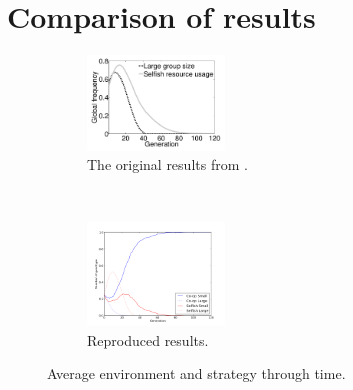 \documentclass[11pt]{ecsarticle}
\begin{document}
\section{Comparison of results}\label{sc:reimp:results}
\begin{figure}
        \centering
        \begin{subfigure}[b]{0.4\textwidth}
                \includegraphics[width=0.4\textwidth]{orig_a.png}
                \caption{The original results from \cite{powers2007individual}.}
                \label{fig:orig:A}
        \end{subfigure}%
        ~ %
        \begin{subfigure}[b]{0.4\textwidth}
                \includegraphics[width=0.4\textwidth]{Code2/fig1.png}
                \caption{Reproduced results.}
                \label{fig:orig:B}
        \end{subfigure}
        \caption{Average environment and strategy through time.}\label{fig:A}
\end{figure}
\end{document}

